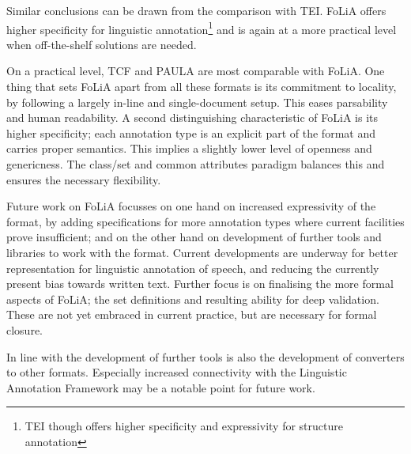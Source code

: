 \documentclass[a4paper,10pt,twoside]{article}
\begin{document}
Similar conclusions can be drawn from the comparison with TEI. FoLiA offers
higher specificity for linguistic annotation\footnote{TEI though offers higher
specificity and expressivity for structure annotation} and is again at a more
practical level when off-the-shelf solutions are needed.

On a practical level, TCF and PAULA are most comparable with FoLiA. One thing
that sets FoLiA apart from all these formats is its commitment to locality, by
following a largely in-line and single-document setup. This eases
parsability and human readability. A second distinguishing characteristic of
FoLiA is its higher specificity; each annotation type is an explicit part of
the format and carries proper semantics. This implies a slightly lower level of
openness and genericness. The class/set and common attributes paradigm balances
this and ensures the necessary flexibility.

Future work on FoLiA focusses on one hand on increased expressivity of the
format, by adding specifications for more annotation types where current
facilities prove insufficient; and on the other hand on development of further
tools and libraries to work with the format. Current developments are
underway for better representation for linguistic annotation of speech, and
reducing the currently present bias towards written text. Further focus is on
finalising the more formal aspects of FoLiA; the set definitions and resulting
ability for deep validation. These are not yet embraced in current practice,
but are necessary for formal closure.

In line with the development of further tools is also the development of
converters to other formats. Especially increased connectivity with the
Linguistic Annotation Framework may be a notable point for future work.

 
  
\end{document}
